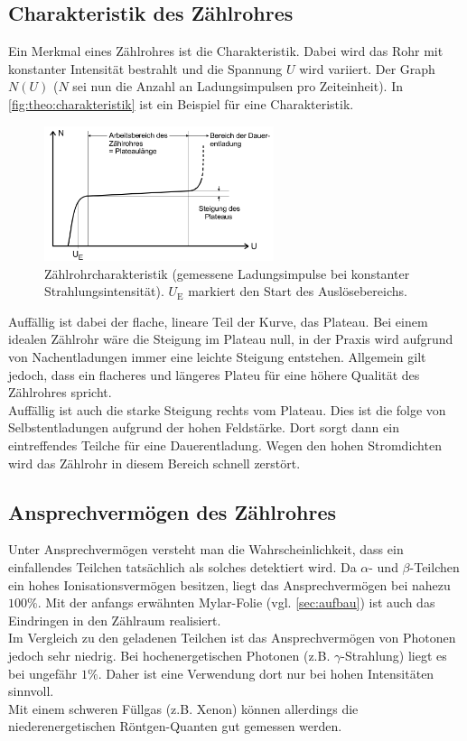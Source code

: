 \subsection{Charakteristik des Zählrohres}
\label{sec:theo:charakteristik}

Ein Merkmal eines Zählrohres ist die Charakteristik. Dabei wird das Rohr mit konstanter Intensität bestrahlt und
die Spannung $U$ wird variiert. Der Graph $N(U)$ ($N$ sei nun die Anzahl an Ladungsimpulsen pro Zeiteinheit). In
\autoref{fig:theo:charakteristik} ist ein Beispiel für eine Charakteristik.
\begin{figure}[H]
	\centering
	\includegraphics[width=0.6\textwidth]{content/charakteristik.png}
	\caption{Zählrohrcharakteristik (gemessene Ladungsimpulse bei konstanter Strahlungsintensität). $U_\text{E}$
	markiert den Start des Auslösebereichs. \cite{sample}}
	\label{fig:theo:charakteristik}
\end{figure}

\noindent
Auffällig ist dabei der flache, lineare Teil der Kurve, das Plateau. Bei einem idealen Zählrohr wäre die Steigung
im Plateau null, in der Praxis wird aufgrund von Nachentladungen immer eine leichte Steigung entstehen. Allgemein gilt
jedoch, dass ein flacheres und längeres Plateu für eine höhere Qualität des Zählrohres spricht.
\\
Auffällig ist auch die starke Steigung rechts vom Plateau. Dies ist die folge von Selbstentladungen aufgrund 
der hohen Feldstärke. Dort sorgt dann ein eintreffendes Teilche für eine Dauerentladung. Wegen den hohen Stromdichten
wird das Zählrohr in diesem Bereich schnell zerstört.

\subsection{Ansprechvermögen des Zählrohres}
\label{sec:theo:ansprechvermoegen}

Unter Ansprechvermögen versteht man die Wahrscheinlichkeit, dass ein einfallendes Teilchen tatsächlich als solches 
detektiert wird. Da $\alpha$- und $\beta$-Teilchen ein hohes Ionisationsvermögen besitzen, liegt das Ansprechvermögen
bei nahezu $100\%$. Mit der anfangs erwähnten Mylar-Folie (vgl. \autoref{sec:aufbau}) ist auch das Eindringen in
den Zählraum realisiert.
\\
Im Vergleich zu den geladenen Teilchen ist das Ansprechvermögen von Photonen jedoch sehr niedrig. Bei hochenergetischen
Photonen (z.B. $\gamma$-Strahlung) liegt es bei ungefähr $1\%$. Daher ist eine Verwendung dort nur bei hohen 
Intensitäten sinnvoll.
\\
Mit einem schweren Füllgas (z.B. Xenon) können allerdings die niederenergetischen Röntgen-Quanten gut gemessen werden.
